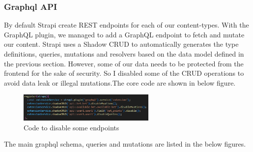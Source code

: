 \documentclass[singlecolumn]{article}
\begin{document}
\subsubsection{Graphql API}

By default Strapi create REST endpoints for each of our content-types. With the GraphQL plugin, we managed to add a GraphQL endpoint to fetch and mutate our content. Strapi uses a Shadow CRUD to automatically generates the type definitions, queries, mutations and resolvers based on the data model defined in the previous section. However, some of our data needs to be protected from the frontend for the sake of security. So I disabled some of the CRUD operations to avoid data leak or illegal mutations.The core code are shown in below figure.

\begin{figure}[H]
    \centering
    \includegraphics[width=0.6\textwidth]{disable_CRUD.png}
    \caption{Code to disable some endpoints}
\end{figure}


The main graphql schema, queries and mutations are listed in the below figures.
\end{document}

